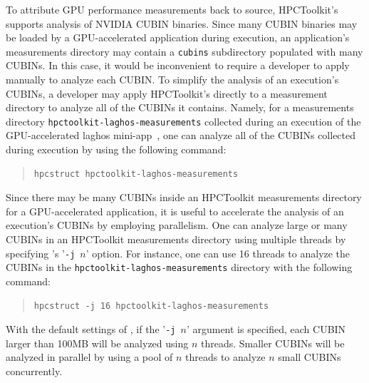 To  attribute GPU performance measurements back to source, HPCToolkit's \hpcstruct{} supports analysis of NVIDIA CUBIN binaries. Since many CUBIN binaries may be loaded  by a GPU-accelerated application during execution,  an application's measurements directory may contain a {\tt cubins} subdirectory populated with many CUBINs. In this case, it would be inconvenient to require a developer to apply \hpcstruct{} manually to analyze each CUBIN. To simplify the analysis of an execution's CUBINs, a developer may apply HPCToolkit's \hpcstruct{} directly to a measurement directory to analyze all of the CUBINs it contains. Namely, for a measurements directory {\tt hpctoolkit-laghos-measurements} collected during an execution of the GPU-accelerated laghos mini-app~\cite{laghos}, one can analyze all of the CUBINs collected during execution by using the following command:

\begin{quote}
\begin{verbatim}
hpcstruct hpctoolkit-laghos-measurements
\end{verbatim}
\end{quote}


Since there may be many CUBINs inside an HPCToolkit measurements directory for a GPU-accelerated application, it is useful to accelerate the analysis of an execution's CUBINs by employing parallelism. One can analyze large or many CUBINs in an HPCToolkit measurements directory using multiple threads by specifying \hpcstruct's '\verb|-j|~$n$' option. For instance, one can use 16 threads to analyze the CUBINs in the {\tt hpctoolkit-laghos-measurements} directory with the following command:

\begin{quote}
\begin{verbatim}
hpcstruct -j 16 hpctoolkit-laghos-measurements
\end{verbatim}
\end{quote}

With the default settings of \hpcstruct{}, if the '\verb|-j|~$n$' argument is specified, each CUBIN larger than 100MB will be analyzed using $n$ threads. Smaller CUBINs will be analyzed in parallel by using a pool of $n$ threads to analyze $n$ small CUBINs concurrently. 

